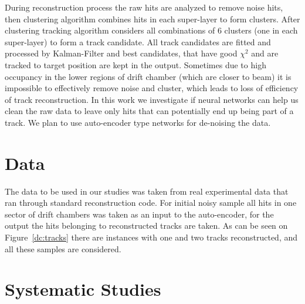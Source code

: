 \documentclass{article}
\begin{document}
During reconstruction process the raw hits are analyzed to remove noise hits, then clustering algorithm combines hits in each super-layer to form clusters. After clustering tracking algorithm considers all combinations of 6 clusters (one in each super-layer) to form a track candidate. All track candidates are fitted and processed by Kalman-Filter and best candidates, that have good $\chi^2$ and are tracked to target position are kept in the output. Sometimes due to high occupancy in the lower regions of drift chamber (which are closer to beam) it is impossible to effectively remove noise and cluster, which leads to loss of efficiency of track reconstruction. In this work we investigate if neural networks can help us clean the raw data to leave only hits that can potentially end up being part of a track. We plan to use auto-encoder type networks for de-noising the data.


\section{Data}

\indent

The data to be used in our studies was taken from real experimental data that ran through standard reconstruction code. For initial noisy sample all hits in one sector of drift chambers was taken as an input to the auto-encoder, for the output the hits belonging to reconstructed tracks are taken. As can be seen on Figure~\ref{dc:tracks} there are instances with one and two tracks reconstructed, and all these samples are considered.


\section{Systematic Studies}
\end{document}
